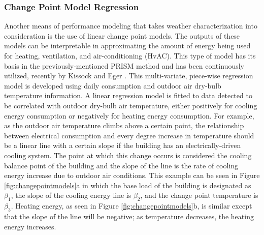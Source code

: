 \subsubsection{Change Point Model Regression}
\label{sec:changepointmodels}

Another means of performance modeling that takes weather characterization into consideration is the use of linear change point models. The outputs of these models can be interpretable in approximating the amount of energy being used for heating, ventilation, and air-conditioning (HvAC). This type of model has its basis in the previously-mentioned PRISM method and has been continuously utilized, recently by Kissock and Eger \cite{Kelly_Kissock_2008}. This multi-variate, piece-wise regression model is developed using daily consumption and outdoor air dry-bulb temperature information. A linear regression model is fitted to data detected to be correlated with outdoor dry-bulb air temperature, either positively for cooling energy consumption or negatively for heating energy consumption. For example, as the outdoor air temperature climbs above a certain point, the relationship between electrical consumption and every degree increase in temperature should be a linear line with a certain slope if the building has an electrically-driven cooling system. The point at which this change occurs is considered the cooling balance point of the building and the slope of the line is the rate of cooling energy increase due to outdoor air conditions. This example can be seen in Figure \ref{fig:changepointmodels}a in which the base load of the building is designated as $\beta_1$, the slope of the cooling energy line is $\beta_2$, and the change point temperature is $\beta_3$. Heating energy, as seen in Figure \ref{fig:changepointmodels}b, is similar except that the slope of the line will be negative; as temperature decreases, the heating energy increases.